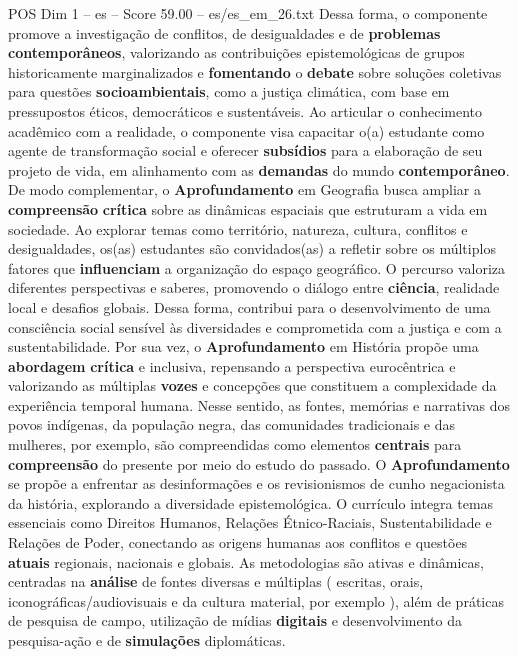 \begin{textsample}{POS Dim 1 – es – Score 59.00 – es/es\_em\_26.txt}
Dessa forma, o componente promove a investigação de conflitos, de desigualdades e de \textbf{problemas} \textbf{contemporâneos}, valorizando as contribuições epistemológicas de grupos historicamente marginalizados e \textbf{fomentando} o \textbf{debate} sobre soluções coletivas para questões \textbf{socioambientais}, como a justiça climática, com base em pressupostos éticos, democráticos e sustentáveis.
Ao articular o conhecimento acadêmico com a realidade, o componente visa capacitar o(a) estudante como agente de transformação social e oferecer \textbf{subsídios} para a elaboração de seu projeto de vida, em alinhamento com as \textbf{demandas} do mundo \textbf{contemporâneo}.
De modo complementar, o \textbf{Aprofundamento} em Geografia busca ampliar a \textbf{compreensão} \textbf{crítica} sobre as dinâmicas espaciais que estruturam a vida em sociedade.
Ao explorar temas como território, natureza, cultura, conflitos e desigualdades, os(as) estudantes são convidados(as) a refletir sobre os múltiplos fatores que \textbf{influenciam} a organização do espaço geográfico.
O percurso valoriza diferentes perspectivas e saberes, promovendo o diálogo entre \textbf{ciência}, realidade local e desafios globais.
Dessa forma, contribui para o desenvolvimento de uma consciência social sensível às diversidades e comprometida com a justiça e com a sustentabilidade.
Por sua vez, o \textbf{Aprofundamento} em História propõe uma \textbf{abordagem} \textbf{crítica} e inclusiva, repensando a perspectiva eurocêntrica e valorizando as múltiplas \textbf{vozes} e concepções que constituem a complexidade da experiência temporal humana.
Nesse sentido, as fontes, memórias e narrativas dos povos indígenas, da população negra, das comunidades tradicionais e das mulheres, por exemplo, são compreendidas como elementos \textbf{centrais} para \textbf{compreensão} do presente por meio do estudo do passado.
O \textbf{Aprofundamento} se propõe a enfrentar as desinformações e os revisionismos de cunho negacionista da história, explorando a diversidade epistemológica.
O currículo integra temas essenciais como Direitos Humanos, Relações Étnico-Raciais, Sustentabilidade e Relações de Poder, conectando as origens humanas aos conflitos e questões \textbf{atuais} regionais, nacionais e globais.
As metodologias são ativas e dinâmicas, centradas na \textbf{análise} de fontes diversas e múltiplas ( escritas, orais, iconográficas/audiovisuais e da cultura material, por exemplo ), além de práticas de pesquisa de campo, utilização de mídias \textbf{digitais} e desenvolvimento da pesquisa-ação e de \textbf{simulações} diplomáticas.

\end{textsample}
